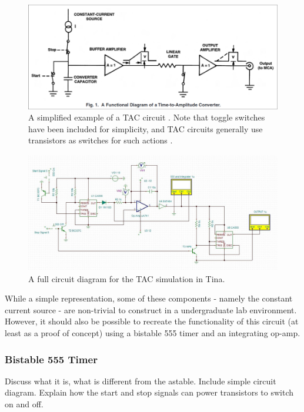 \documentclass[%
 reprint,
 amsmath,amssymb,
 aps,
]{revtex4-2}
\begin{document}
        \begin{figure}
            \includegraphics[width=1.8\columnwidth]{Images/tacManual}
            \caption{\label{fig:tacManual}A simplified example of a TAC circuit \cite{ortec}. Note that toggle switches have been included for simplicity, and TAC circuits generally use transistors as switches for such actions \cite{ortec}.}
        \end{figure}
        
        \begin{figure}
            \includegraphics[width=2\columnwidth]{Images/tac}
            \caption{\label{fig:tac}A full circuit diagram for the TAC simulation in Tina.}
        \end{figure}

        While a simple representation, some of these components - namely the constant current source - are non-trivial to construct in a undergraduate lab environment. However, it should also be possible to recreate the functionality of this circuit (at least as a proof of concept) using a bistable 555 timer and an integrating op-amp.

        \subsubsection{Bistable 555 Timer}
        Discuss what it is, what is different from the astable. Include simple circuit diagram. Explain how the start and stop signals can power transistors to switch on and off.\\
\end{document}

